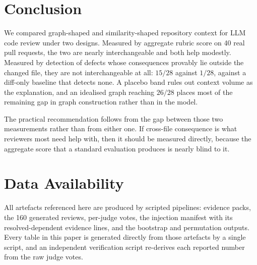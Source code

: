 \documentclass[conference]{IEEEtran}
\begin{document}
\section{Conclusion}
\label{sec:conclusion}

We compared graph-shaped and similarity-shaped repository context for LLM
code review under two designs. Measured by aggregate rubric score on 40 real
pull requests, the two are nearly interchangeable and both help modestly.
Measured by detection of defects whose consequences provably lie outside the
changed file, they are not interchangeable at all: $15/28$ against $1/28$,
against a diff-only baseline that detects none. A placebo band rules out
context volume as the explanation, and an idealised graph reaching $26/28$
places most of the remaining gap in graph construction rather than in the
model.

The practical recommendation follows from the gap between those two
measurements rather than from either one. If cross-file consequence is what
reviewers most need help with, then it should be measured directly, because
the aggregate score that a standard evaluation produces is nearly blind to
it.


\section*{Data Availability}
All artefacts referenced here are produced by scripted pipelines: evidence
packs, the 160 generated reviews, per-judge votes, the injection manifest
with its resolved-dependent evidence lines, and the bootstrap and
permutation outputs. Every table in this paper is generated directly from
those artefacts by a single script, and an independent verification script
re-derives each reported number from the raw judge votes.



\end{document}
